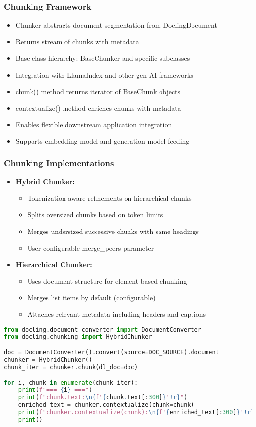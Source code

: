 \begin{frame}[fragile]\frametitle{Chunking Framework}
      \begin{itemize}
	\item Chunker abstracts document segmentation from DoclingDocument
	\item Returns stream of chunks with metadata
	\item Base class hierarchy: BaseChunker and specific subclasses
	\item Integration with LlamaIndex and other gen AI frameworks
	\item chunk() method returns iterator of BaseChunk objects
	\item contextualize() method enriches chunks with metadata
	\item Enables flexible downstream application integration
	\item Supports embedding model and generation model feeding
	  \end{itemize}
\end{frame}

\begin{frame}[fragile]\frametitle{Chunking Implementations}
      \begin{itemize}
	\item \textbf{Hybrid Chunker:}
	\begin{itemize}
		\item Tokenization-aware refinements on hierarchical chunks
		\item Splits oversized chunks based on token limits
		\item Merges undersized successive chunks with same headings
		\item User-configurable merge\_peers parameter
	\end{itemize}
	\item \textbf{Hierarchical Chunker:}
	\begin{itemize}
		\item Uses document structure for element-based chunking  
		\item Merges list items by default (configurable)
		\item Attaches relevant metadata including headers and captions
	\end{itemize}
	  \end{itemize}
	  
\begin{lstlisting}[language=Python, basicstyle=\tiny]
from docling.document_converter import DocumentConverter
from docling.chunking import HybridChunker

doc = DocumentConverter().convert(source=DOC_SOURCE).document
chunker = HybridChunker()
chunk_iter = chunker.chunk(dl_doc=doc)

for i, chunk in enumerate(chunk_iter):
    print(f"=== {i} ===")
    print(f"chunk.text:\n{f'{chunk.text[:300]}'!r}")
    enriched_text = chunker.contextualize(chunk=chunk)
    print(f"chunker.contextualize(chunk):\n{f'{enriched_text[:300]}'!r}")
    print()
\end{lstlisting}		  
\end{frame}

